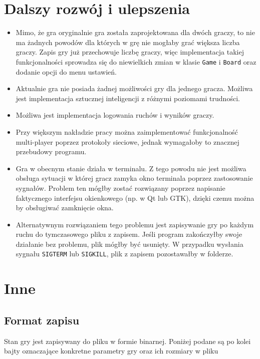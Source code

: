 \documentclass{article}
\begin{document}
\section{Dalszy rozwój i ulepszenia}

\begin{itemize}
    \item Mimo, że gra oryginalnie gra została zaprojektowana dla dwóch graczy, to nie ma żadnych powodów dla których
    w grę nie mogłaby grać większa liczba graczy. Zapis gry już przechowuje liczbę graczy, więc implementacja
    takiej funkcjonalności sprowadza się do niewielkich zmian w klasie \texttt{Game} i \texttt{Board} oraz dodanie
    opcji do menu ustawień.
    \item Aktualnie gra nie posiada żadnej możliwości gry dla jednego gracza. Możliwa jest implementacja sztucznej
    inteligencji z różnymi poziomami trudności.
    \item Możliwa jest implementacja logowania ruchów i wyników graczy.
    \item Przy większym nakładzie pracy można zaimplementować funkcjonalność multi-player poprzez protokoły sieciowe,
    jednak wymagałoby to znacznej przebudowy programu.
    \item Gra w obecnym stanie działa w terminalu. Z tego powodu nie jest możliwa obsługa sytuacji w której gracz
    zamyka okno terminala poprzez zastosowanie sygnałów. Problem ten mógłby zostać rozwiązany poprzez napisanie
    faktycznego interfejsu okienkowego (np. w Qt lub GTK), dzięki czemu można by obsługiwać zamknięcie okna.
    \item Alternatywnym rozwiązaniem tego problemu jest zapisywanie gry po każdym ruchu do tymczasowego pliku z zapisem.
    Jeśli program zakończyłby swoje działanie bez problemu, plik mógłby być usunięty. W przypadku wysłania sygnału 
    \texttt{SIGTERM} lub \texttt{SIGKILL}, plik z zapisem pozostawałby w folderze.
\end{itemize}

\section{Inne}

\subsection{Format zapisu}

Stan gry jest zapisywany do pliku w formie binarnej. Poniżej podane są po kolei bajty oznaczające konkretne parametry 
gry oraz ich rozmiary w pliku
\end{document}
